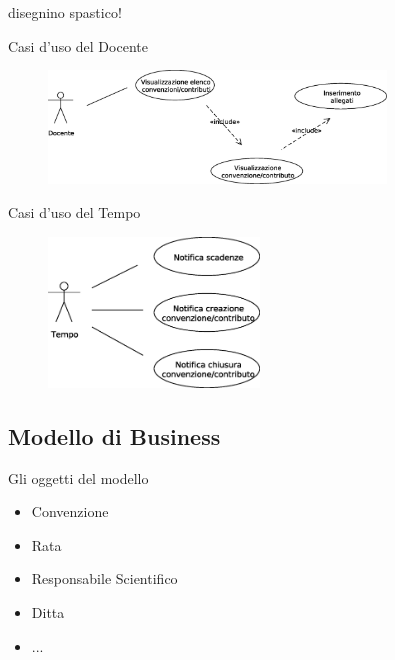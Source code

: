   \begin{frame}{}
    disegnino spastico!
   
  \end{frame}


  
  \begin{frame}{Casi d'uso del Docente}
    \begin{figure}[h]
      \label{use_case_diag_teacher}
      \centering
      \includegraphics[width=0.8\textwidth]{images/casi_uso_docente.eps}
    \end{figure}
  \end{frame}
  
  \begin{frame}{Casi d'uso del Tempo}
    \begin{figure}[h]
      \label{use_case_diag_time}
      \centering
      \includegraphics[width = 0.5\textwidth]{images/casi_uso_tempo.eps}
    \end{figure}
  \end{frame}


  
  \subsection{Modello di Business}
  \begin{frame}{Gli oggetti del modello}
     \begin{itemize}
      \item Convenzione
      \item Rata
      \item Responsabile Scientifico
      \item Ditta
      \item ...
     \end{itemize}

   
  \end{frame}
  

